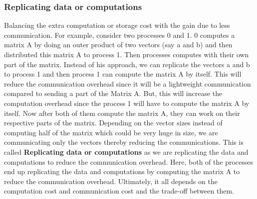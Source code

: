 \documentclass[12pt]{article}
\begin{document}
\subsubsection{Replicating data or computations }
Balancing the extra computation or storage cost with the gain due to less communication.
For example, consider two processes 0 and 1. 0 computes a matrix A by doing an outer product of two vectors (say a and b) and then distributed this matrix A to process 1.
Then processes computes with their own part of the matrix. 
Instead of his approach, we can replicate the vectors a and b to process 1 and then process 1 can compute the matrix A by itself. This will reduce the communication overhead 
since it will be a lightweight communication compared to sending a part of the Matrix A. But, this will increase the computation overhead since the process 1 will have to compute the matrix A by itself.
Now after both of them compute the matrix A, they can work on their respective parts of the matrix. Depending on the vector sizes instead of computing half of the matrix which could be very huge in size,
we are communicating only the vectors thereby reducing the communications. This is called \textbf{Replicating data or computations} as we are replicating the data and computations to reduce the communication overhead. Here, 
both of the processes end up replicating the data and computations by computing the matrix A to reduce the communication overhead. Ultimately, it all depends on the computation cost and communication cost and the trade-off between them.
\end{document}
